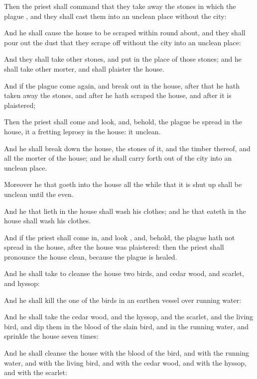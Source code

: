 {Then the
priest shall
command that they
take away the
stones in
which the
plague
{}, and they shall
cast them into an
unclean
place
without the
city:

And he shall cause the
house to be
scraped
within round
about, and they shall
pour out the
dust that they
scrape off
without the
city into an
unclean
place:

And they shall
take
other
stones, and
put
{} in the
place of those
stones; and he shall
take
other
morter, and shall
plaister the
house.

And if the
plague come
again, and
break out in the
house,
after that he hath
taken away the
stones, and
after he hath
scraped the
house, and
after it is
plaistered;

Then the
priest shall
come and
look, and, behold,
{} the
plague be
spread in the
house, it
{} a
fretting
leprosy in the
house: it
{}
unclean.

And he shall break
down the
house, the
stones of it, and the
timber thereof, and all the
morter of the
house; and he shall carry
{}
forth
out of the
city into an
unclean
place.

Moreover he that
goeth into the
house all the
while that it is
shut up shall be
unclean until the
even.

And he that
lieth in the
house shall
wash his
clothes; and he that
eateth in the
house shall
wash his
clothes.

And if the
priest shall come
in, and
look
{}, and, behold, the
plague hath not
spread in the
house,
after the
house was
plaistered: then the
priest shall pronounce the
house
clean, because the
plague is
healed.

And he shall
take to
cleanse the
house
two
birds, and
cedar
wood, and
scarlet, and
hyssop:

And he shall
kill the
one of the
birds in an
earthen
vessel over
running
water:

And he shall
take the
cedar
wood, and the
hyssop, and the
scarlet, and the
living
bird, and
dip them in the
blood of the
slain
bird, and in the
running
water, and
sprinkle the
house
seven
times:

And he shall
cleanse the
house with the
blood of the
bird, and with the
running
water, and with the
living
bird, and with the
cedar
wood, and with the
hyssop, and with the
scarlet:

}
